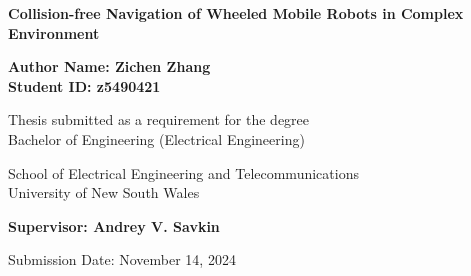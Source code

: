 \documentclass[12pt, a4paper]{report}
\begin{document}
\begin{titlepage}
    \centering
    \vspace*{1cm}
    
    {\LARGE \textbf{Collision-free Navigation of Wheeled Mobile Robots in Complex Environment}}
    
    \vspace{1.5cm}
    
    \textbf{Author Name: Zichen Zhang}\\
    \textbf{Student ID: z5490421}\\
    \vspace{0.5cm}
    
    Thesis submitted as a requirement for the degree\\
    Bachelor of Engineering (Electrical Engineering)\\
    
    \vfill
    
    School of Electrical Engineering and Telecommunications\\
    University of New South Wales\\
    
    \vspace{0.8cm}
    
    \textbf{Supervisor: Andrey V. Savkin}
    
    \vspace{1.5cm}
    
    Submission Date: November 14, 2024
    
\end{titlepage}

\tableofcontents
\newpage











\cite{Liu2012}
\cite{Hoy2015}
\cite{Matveev2012}
\cite{Fiorini1998}
\cite{Mayne2014}
\cite{Falcone2016}
\cite{Edwards2000}
\cite{Sarkar2009}
\cite{Fiorini1998}
\cite{Bareiss2015}
\cite{Kim2000}
\cite{Ge2000}
\cite{Lumelsky1991}
\cite{Turpin2014}
\cite{Dunbar2006}

\printbibliography %
\end{document}
